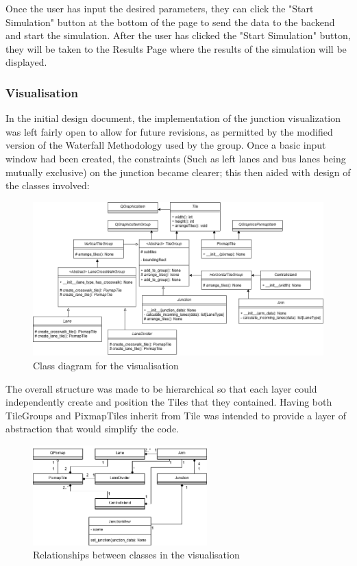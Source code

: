 \documentclass{article}
\begin{document}
    Once the user has input the desired parameters, they can click the "Start Simulation" button at the bottom of the page to send the data to the backend and start the simulation. After the user has clicked the "Start Simulation" button, they
    will be taken to the Results Page where the results of the simulation will be displayed.

        \subsubsection{Visualisation}
            In the initial design document, the implementation of the junction visualization was left fairly open to allow for future revisions, as permitted by the modified version of the Waterfall Methodology used by the group. Once a basic input window had been created, the constraints (Such as left lanes and bus lanes being mutually exclusive) on the junction became clearer; this then aided with design of the classes involved:
            \begin{figure}[H]
                \centering
                \includegraphics[width=\textwidth]{visualisation_class}
                \caption{Class diagram for the visualisation}
                \label{fig:visualisation_class}
            \end{figure}
            The overall structure was made to be hierarchical so that each layer could independently create and position the Tiles that they contained. Having both TileGroups and PixmapTiles inherit from Tile was intended to provide a layer of abstraction that would simplify the code.
            \begin{figure}[H]
                \centering
                \includegraphics[width=0.6\textwidth]{visualisation_relationship}
                \caption{Relationships between classes in the visualisation}
                \label{fig:visualisation_relationship}
            \end{figure}
\end{document}
